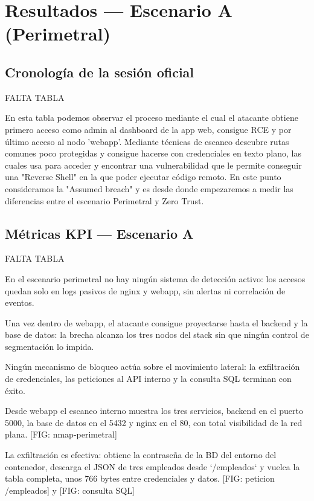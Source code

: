 \documentclass[11pt,spanish,listoffigures,listoftables]{tfgetsinf}
\begin{document}
    \section{Resultados — Escenario A (Perimetral)}
    \label{sec:6.2}
        \subsection{Cronología de la sesión oficial}
        FALTA TABLA

        En esta tabla podemos observar el proceso mediante el cual el atacante obtiene primero acceso como admin al dashboard de la app web, consigue RCE y por último acceso al nodo 'webapp'. Mediante técnicas de escaneo descubre rutas comunes poco protegidas y consigue hacerse con credenciales en texto plano, las cuales usa para acceder y encontrar una vulnerabilidad que le permite conseguir una "Reverse Shell" en la que poder ejecutar código remoto. En este punto consideramos la "Assumed breach" y es desde donde empezaremos a medir las diferencias entre el escenario Perimetral y Zero Trust.
        
        \subsection{Métricas KPI — Escenario A}
        FALTA TABLA

        En el escenario perimetral no hay ningún sistema de detección activo: los accesos quedan solo en logs pasivos de nginx y webapp, sin alertas ni correlación de eventos.

        Una vez dentro de webapp, el atacante consigue proyectarse hasta el backend y la base de datos: la brecha alcanza los tres nodos del stack sin que ningún control de segmentación lo impida.
        
        Ningún mecanismo de bloqueo actúa sobre el movimiento lateral: la exfiltración de credenciales, las peticiones al API interno y la consulta SQL terminan con éxito.
        
        Desde webapp el escaneo interno muestra los tres servicios, backend en el puerto 5000, la base de datos en el 5432 y nginx en el 80, con total visibilidad de la red plana. [FIG: nmap-perimetral]
        
        La exfiltración es efectiva: obtiene la contraseña de la BD del entorno del contenedor, descarga el JSON de tres empleados desde `/empleados` y vuelca la tabla completa, unos 766 bytes entre credenciales y datos. [FIG: peticion /empleados] y [FIG: consulta SQL]
        
\end{document}
